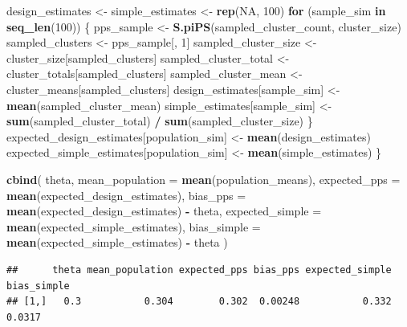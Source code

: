 \documentclass[
  spanish,
  12pt,
]{book}
\newenvironment{Shaded}{\begin{snugshade}}{\end{snugshade}}
\newcommand{\AttributeTok}[1]{\textcolor[rgb]{0.13,0.29,0.53}{#1}}
\newcommand{\ConstantTok}[1]{\textcolor[rgb]{0.56,0.35,0.01}{#1}}
\newcommand{\ControlFlowTok}[1]{\textcolor[rgb]{0.13,0.29,0.53}{\textbf{#1}}}
\newcommand{\DecValTok}[1]{\textcolor[rgb]{0.00,0.00,0.81}{#1}}
\newcommand{\FunctionTok}[1]{\textcolor[rgb]{0.13,0.29,0.53}{\textbf{#1}}}
\newcommand{\NormalTok}[1]{#1}
\newcommand{\OtherTok}[1]{\textcolor[rgb]{0.56,0.35,0.01}{#1}}
\newcommand{\SpecialCharTok}[1]{\textcolor[rgb]{0.81,0.36,0.00}{\textbf{#1}}}
\begin{document}
\begin{Shaded}
\begin{Highlighting}[]
\NormalTok{  design\_estimates }\OtherTok{\textless{}{-}}\NormalTok{ simple\_estimates }\OtherTok{\textless{}{-}} \FunctionTok{rep}\NormalTok{(}\ConstantTok{NA}\NormalTok{, }\DecValTok{100}\NormalTok{)}
  \ControlFlowTok{for}\NormalTok{ (sample\_sim }\ControlFlowTok{in} \FunctionTok{seq\_len}\NormalTok{(}\DecValTok{100}\NormalTok{)) \{}
\NormalTok{    pps\_sample }\OtherTok{\textless{}{-}} \FunctionTok{S.piPS}\NormalTok{(sampled\_cluster\_count, cluster\_size)}
\NormalTok{    sampled\_clusters }\OtherTok{\textless{}{-}}\NormalTok{ pps\_sample[, }\DecValTok{1}\NormalTok{]}
\NormalTok{    sampled\_cluster\_size }\OtherTok{\textless{}{-}}\NormalTok{ cluster\_size[sampled\_clusters]}
\NormalTok{    sampled\_cluster\_total }\OtherTok{\textless{}{-}}\NormalTok{ cluster\_totals[sampled\_clusters]}
\NormalTok{    sampled\_cluster\_mean }\OtherTok{\textless{}{-}}\NormalTok{ cluster\_means[sampled\_clusters]}
\NormalTok{    design\_estimates[sample\_sim] }\OtherTok{\textless{}{-}} \FunctionTok{mean}\NormalTok{(sampled\_cluster\_mean)}
\NormalTok{    simple\_estimates[sample\_sim] }\OtherTok{\textless{}{-}}
      \FunctionTok{sum}\NormalTok{(sampled\_cluster\_total) }\SpecialCharTok{/} \FunctionTok{sum}\NormalTok{(sampled\_cluster\_size)}
\NormalTok{  \}}
\NormalTok{  expected\_design\_estimates[population\_sim] }\OtherTok{\textless{}{-}} \FunctionTok{mean}\NormalTok{(design\_estimates)}
\NormalTok{  expected\_simple\_estimates[population\_sim] }\OtherTok{\textless{}{-}} \FunctionTok{mean}\NormalTok{(simple\_estimates)}
\NormalTok{\}}

\FunctionTok{cbind}\NormalTok{(}
\NormalTok{  theta,}
  \AttributeTok{mean\_population =} \FunctionTok{mean}\NormalTok{(population\_means),}
  \AttributeTok{expected\_pps =} \FunctionTok{mean}\NormalTok{(expected\_design\_estimates),}
  \AttributeTok{bias\_pps =} \FunctionTok{mean}\NormalTok{(expected\_design\_estimates) }\SpecialCharTok{{-}}\NormalTok{ theta,}
  \AttributeTok{expected\_simple =} \FunctionTok{mean}\NormalTok{(expected\_simple\_estimates),}
  \AttributeTok{bias\_simple =} \FunctionTok{mean}\NormalTok{(expected\_simple\_estimates) }\SpecialCharTok{{-}}\NormalTok{ theta}
\NormalTok{)}
\end{Highlighting}
\end{Shaded}

\begin{verbatim}
##      theta mean_population expected_pps bias_pps expected_simple bias_simple
## [1,]   0.3           0.304        0.302  0.00248           0.332      0.0317
\end{verbatim}
\end{document}
